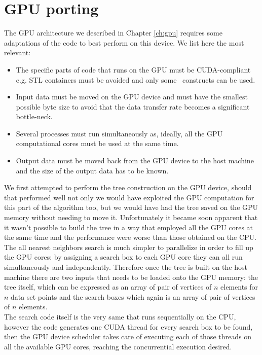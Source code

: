 \section{GPU porting}\label{sec:volume_kdtree_gpuport}
The GPU architecture we described in Chapter \ref{ch:gpu} requires some adaptations of the code to best perform on this device. We list here the most relevant:
\begin{itemize}
\item The specific parts of code that runs on the GPU must be CUDA-compliant e.g. STL containers must be avoided and only some \CC\ constructs can be used.
\item Input data must be moved on the GPU device and must have the smallest possible byte size to avoid that the data transfer rate becomes a significant bottle-neck.
\item Several processes must run simultaneously as, ideally, all the GPU computational cores must be used at the same time.
\item Output data must be moved back from the GPU device to the host machine and the size of the output data has to be known.
\end{itemize}
We first attempted to perform the tree construction on the GPU device, should that performed well not only we would have exploited the GPU computation for this part of the algorithm too, but we would have had the tree saved on the GPU memory without needing to move it. Unfortunately it became soon apparent that it wasn't possible to build the tree in a way that employed all the GPU cores at the same time and the performance were worse than those obtained on the CPU.\\
The all nearest neighbors search is much simpler to parallelize in order to fill up the GPU cores: by assigning a search box to each GPU core they can all run simultaneously and independently. Therefore once the tree is built on the host machine there are two inputs that needs to be loaded onto the GPU memory: the tree itself, which can be expressed as an array of pair of vertices of $n$ elements for $n$ data set points and the search boxes which again is an array of pair of vertices of $n$ elements.\\
The search code itself is the very same that runs sequentially on the CPU, however the code generates one CUDA thread for every search box to be found, then the GPU device scheduler takes care of executing each of those threads on all the available GPU cores, reaching the concurrential execution desired.\\
